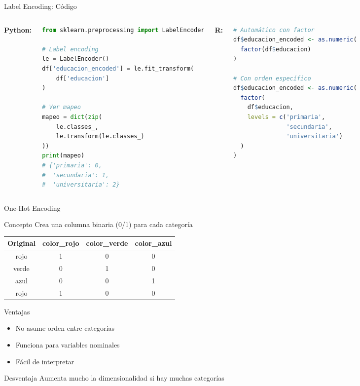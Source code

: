 \documentclass[aspectratio=169]{beamer}
\begin{document}
\begin{frame}[fragile]{Label Encoding: Código}
\begin{columns}[t]
\textbf{Python:}
\begin{lstlisting}[language=Python]
from sklearn.preprocessing import LabelEncoder

# Label encoding
le = LabelEncoder()
df['educacion_encoded'] = le.fit_transform(
    df['educacion']
)

# Ver mapeo
mapeo = dict(zip(
    le.classes_, 
    le.transform(le.classes_)
))
print(mapeo)
# {'primaria': 0, 
#  'secundaria': 1, 
#  'universitaria': 2}
\end{lstlisting}

\textbf{R:}
\begin{lstlisting}[language=R]
# Automático con factor
df$educacion_encoded <- as.numeric(
  factor(df$educacion)
)

# Con orden específico
df$educacion_encoded <- as.numeric(
  factor(
    df$educacion,
    levels = c('primaria', 
               'secundaria', 
               'universitaria')
  )
)
\end{lstlisting}
\end{columns}
\end{frame}

\begin{frame}{One-Hot Encoding}
\begin{block}{Concepto}
Crea una columna binaria (0/1) para cada categoría
\end{block}

\begin{center}
\begin{tabular}{|c|c|c|c|}
\hline
\textbf{Original} & \textbf{color\_rojo} & \textbf{color\_verde} & \textbf{color\_azul} \\
\hline
rojo & 1 & 0 & 0 \\
verde & 0 & 1 & 0 \\
azul & 0 & 0 & 1 \\
rojo & 1 & 0 & 0 \\
\hline
\end{tabular}
\end{center}

\pause

\begin{block}{Ventajas}
\begin{itemize}
    \item No asume orden entre categorías
    \item Funciona para variables nominales
    \item Fácil de interpretar
\end{itemize}
\end{block}

\begin{alertblock}{Desventaja}
Aumenta mucho la dimensionalidad si hay muchas categorías
\end{alertblock}
\end{frame}
\end{document}
